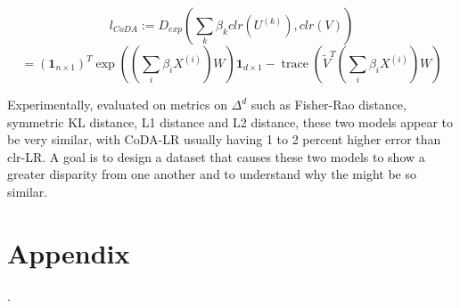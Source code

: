 \documentclass[BSc]{usydthesis}
\numberwithin{equation}{chapter}
\theoremstyle{remark}
\begin{document}
$$ l_{CoDA} := D_{exp} \left( \sum_k \beta_k clr(U^{(k)} ), clr(V) \right)$$
$$ = (\mathbf{1}_{n \times 1})^T \exp \left( (\sum_i \beta_i X^{(i)})W \right) \mathbf{1}_{d\times 1} - \operatorname{trace}(\tilde{V}^T (\sum_i \beta_i X^{(i)})W )$$

Experimentally, evaluated on metrics on $\Delta^d$ such as Fisher-Rao distance, symmetric KL distance, L1 distance and L2 distance, these two models appear to be very similar, with CoDA-LR usually having 1 to 2 percent higher error than clr-LR. A goal is to design a dataset that causes these two models to show a greater disparity from one another and to understand why the might be so similar. 


\chapter*{Appendix}
.
\end{document}
